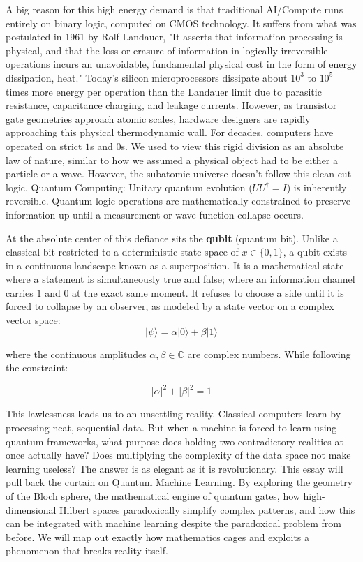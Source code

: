 \documentclass[12pt]{article}
\begin{document}
A big reason for this high energy demand is that traditional AI/Compute runs entirely on binary logic, computed on CMOS technology. It suffers from what was postulated in 1961 by Rolf Landauer, "It asserts that information processing is physical, and that the loss or erasure of information in logically irreversible operations incurs an unavoidable, fundamental physical cost in the form of energy dissipation, heat." Today’s silicon microprocessors dissipate about $10^3 \text{ to } 10^5$ times more energy per operation than the Landauer limit due to parasitic resistance, capacitance charging, and leakage currents. However, as transistor gate geometries approach atomic scales, hardware designers are rapidly approaching this physical thermodynamic wall. For decades, computers have operated on strict $1$s and $0$s. We used to view this rigid division as an absolute law of nature, similar to how we assumed a physical object had to be either a particle or a wave. However, the subatomic universe doesn't follow this clean-cut logic. Quantum Computing: Unitary quantum evolution ($U U^\dagger = I$) is inherently reversible. Quantum logic operations are mathematically constrained to preserve information up until a measurement or wave-function collapse occurs.
\vspace{0.3cm}

At the absolute center of this defiance sits the \textbf{qubit} (quantum bit). Unlike a classical bit restricted to a deterministic state space of $x \in \{0, 1\}$, a qubit exists in a continuous landscape known as a superposition. It is a mathematical state where a statement is simultaneously true and false; where an information channel carries $1$ and $0$ at the exact same moment. It refuses to choose a side until it is forced to collapse by an observer, as modeled by a state vector on a complex vector space:
\begin{equation}
 |\psi\rangle = \alpha|0\rangle + \beta|1\rangle
\end{equation}
\vspace{0.1cm}

where the continuous amplitudes $\alpha, \beta \in \mathbb{C}$ are complex numbers. While following the constraint:

\begin{equation}
|\alpha|^2 + |\beta|^2 = 1
\end{equation}
\vspace{0.1cm}

This lawlessness leads us to an unsettling reality. Classical computers learn by processing neat, sequential data. But when a machine is forced to learn using quantum frameworks, what purpose does holding two contradictory realities at once actually have? Does multiplying the complexity of the data space not make learning useless? 
The answer is as elegant as it is revolutionary. This essay will pull back the curtain on Quantum Machine Learning. By exploring the geometry of the Bloch sphere, the mathematical engine of quantum gates, how high-dimensional Hilbert spaces paradoxically simplify complex patterns, and how this can be integrated with machine learning despite the paradoxical problem from before. We will map out exactly how mathematics cages and exploits a phenomenon that breaks reality itself.
\end{document}
